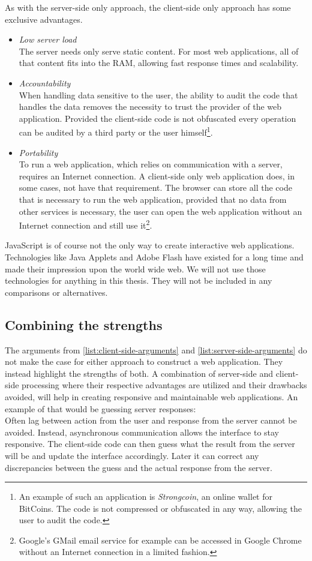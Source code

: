 \documentclass[thesis.tex]{subfiles}
\begin{document}
As with the server-side only approach, the client-side only approach has some
exclusive advantages.

\begin{itemize}
	\label{list:client-side-arguments}
	\item \emph{Low server load}\\
	The server needs only serve static content. For most web applications,
	all of that content fits into the RAM, allowing fast response times and
	scalability.
	\item \emph{Accountability}\\
	When handling data sensitive to the user, the ability to audit the code that
	handles the data removes the necessity to trust the provider of the
	web application. Provided the client-side code is not obfuscated every
	operation can be audited by a third party or the user himself\footnote{An
		example of such an application is \emph{Strongcoin}, an online wallet
		for BitCoins. The code is not compressed or obfuscated in any way, allowing
		the user to audit the code.
	}.
	\item \emph{Portability}\\
	To run a web application, which relies on communication with a server,
	requires an Internet connection. A client-side only web application does,
	in some cases, not have that requirement. The browser can store all the code
	that is necessary to run the web application, provided that no data from other
	services is necessary, the user can open the web application without an
	Internet connection and still use it\footnote{Google's GMail email service
		for example can be accessed in Google Chrome
		without an Internet connection in a limited fashion.
	}.
\end{itemize}

JavaScript is of course not the only way to create interactive web applications.
Technologies like Java Applets and Adobe Flash have existed for a long time and
made their impression upon the world wide web. We will not use those
technologies for anything in this thesis. They will not be included
in any comparisons or alternatives.

\subsection{Combining the strengths}
The arguments from
\ref{list:client-side-arguments} and \ref{list:server-side-arguments}
do not make the case for either approach to construct a web application.
They instead highlight the strengths of both.
A combination of server-side and client-side processing where their respective
advantages are utilized and their drawbacks avoided, will help in creating
responsive and maintainable web applications.
An example of that would be guessing server responses:\\
Often lag between action from the user and response from the server cannot be
avoided. Instead, asynchronous communication allows the interface to stay
responsive. The client-side code can then guess what the result from the server
will be and update the interface accordingly.
Later it can correct any discrepancies between the guess and the actual
response from the server.
\end{document}
